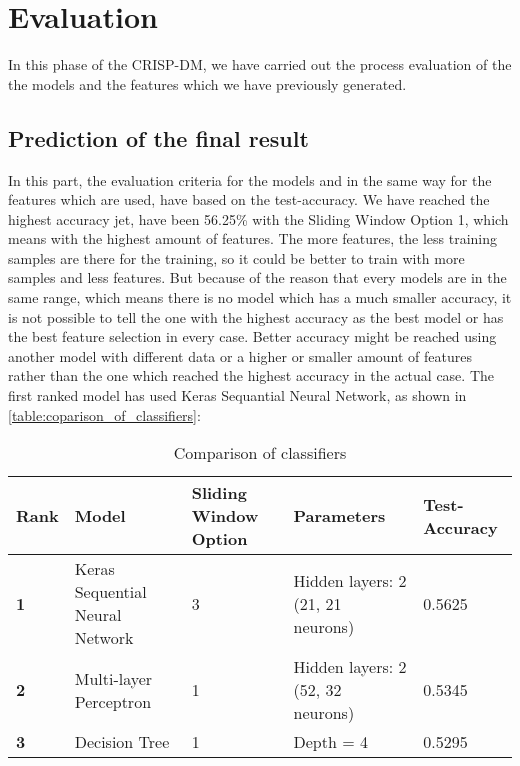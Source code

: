 
\chapter{Evaluation}
In this phase of the CRISP-DM, we have carried out the process evaluation of the the models and the features which we have previously generated.\newline

\section{Prediction of the final result}
In this part, the evaluation criteria for the models and in the same way for the features which are used, have based on the test-accuracy. We have reached the highest accuracy jet, have been 56.25\% with the Sliding Window Option 1, which means with the highest amount of features. The more features, the less training samples are there for the training, so it could be better to train with more samples and less features. But because of the reason that every models are in the same range, which means there is no model which has a much smaller accuracy, it is not possible to tell the one with the highest accuracy as the best model or has the best feature selection in every case. Better accuracy might be reached using another model with different data or a higher or smaller amount of features rather than the one which reached the highest accuracy in the actual case. The first ranked model has used Keras Sequantial Neural Network, as shown in \autoref{table:coparison_of_classifiers}:

\begin{table}[H]
\centering
\begin{tabular}{|p{2.5cm}|p{2.5cm}|p{2.5cm}|p{2.5cm}|p{2.5cm}|}
\hline

\textbf{Rank} & \textbf{Model} & \textbf{Sliding Window Option} & \textbf{Parameters} & \textbf{Test-Accuracy} \\ \hline
\textbf{1} & Keras Sequential Neural Network & 3 & Hidden layers: 2 (21, 21 neurons) & 0.5625 \\ \hline
\textbf{2} & Multi-layer Perceptron & 1 & Hidden layers: 2 (52, 32 neurons) & 0.5345 \\ \hline
\textbf{3} & Decision Tree & 1 & Depth = 4 & 0.5295 \\ \hline

\end{tabular}
\caption{Comparison of classifiers}
\label{table:coparison_of_classifiers}
\end{table}

